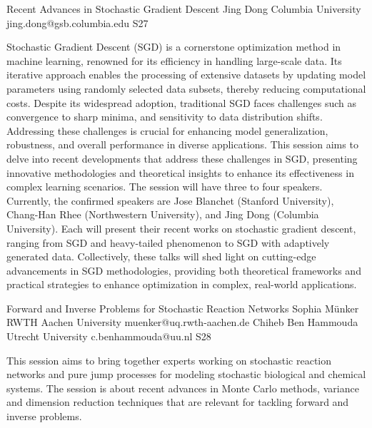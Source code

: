 \begin{session}
 {Recent Advances in Stochastic Gradient Descent}%
 {Jing Dong}%
 {Columbia University}%
 {jing.dong@gsb.columbia.edu}%
{}{}{}
 {S27}%
{}

 Stochastic Gradient Descent (SGD) is a cornerstone optimization method in machine learning,
 renowned for its efficiency in handling large-scale data. Its iterative approach enables
 the processing of extensive datasets by updating model parameters using randomly selected
 data subsets, thereby reducing computational costs. Despite its widespread adoption, traditional
 SGD faces challenges such as convergence to sharp minima, and sensitivity to data
 distribution shifts. Addressing these challenges is crucial for enhancing model generalization,
 robustness, and overall performance in diverse applications. This session aims to delve into
 recent developments that address these challenges in SGD, presenting innovative methodologies
 and theoretical insights to enhance its effectiveness in complex learning scenarios.
 The session will have three to four speakers. Currently, the confirmed speakers are Jose
 Blanchet (Stanford University), Chang-Han Rhee (Northwestern University), and Jing Dong
 (Columbia University). Each will present their recent works on stochastic gradient descent,
 ranging from SGD and heavy-tailed phenomenon to SGD with adaptively generated data.
 Collectively, these talks will shed light on cutting-edge advancements in SGD methodologies,
 providing both theoretical frameworks and practical strategies to enhance optimization in
 complex, real-world applications.
\end{session}



\clearpage

\begin{session}
 {Forward and Inverse Problems for Stochastic Reaction Networks}%
 {Sophia Münker}%
 {RWTH Aachen University}%
 {muenker@uq.rwth-aachen.de}%
 {Chiheb Ben Hammouda}%
 {Utrecht University}%
 {c.benhammouda@uu.nl}%
 {S28}%
 {}%

 This session aims to bring together experts working on stochastic reaction networks and pure jump processes for modeling stochastic biological and chemical systems. The session is about recent advances in Monte Carlo methods, variance and dimension reduction techniques that are relevant for tackling forward and inverse problems.
\end{session}

